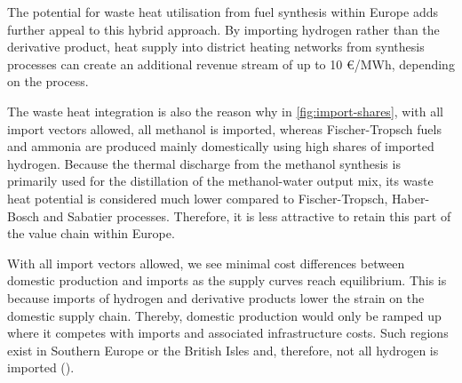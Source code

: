 
The potential for waste heat utilisation from fuel synthesis within Europe adds
further appeal to this hybrid approach. By importing hydrogen rather than the
derivative product, heat supply into district heating networks from synthesis
processes can create an additional revenue stream of up to 10 \euro{}/MWh,
depending on the process.


The waste heat integration is also the reason why in \cref{fig:import-shares},
with all import vectors allowed, all methanol is imported, whereas
Fischer-Tropsch fuels and ammonia are produced mainly domestically using high
shares of imported hydrogen. Because the thermal discharge from the methanol
synthesis is primarily used for the distillation of the methanol-water output
mix, its waste heat potential is considered much lower compared to
Fischer-Tropsch, Haber-Bosch and Sabatier processes. Therefore, it is less
attractive to retain this part of the value chain within Europe.


With all import vectors allowed, we see minimal cost differences between
domestic production and imports as the supply curves reach equilibrium. This is
because imports of hydrogen and derivative products lower the strain on the
domestic supply chain. Thereby, domestic production would only be ramped up
where it competes with imports and associated infrastructure costs. Such regions
exist in Southern Europe or the British Isles and, therefore, not all hydrogen
is imported ().


